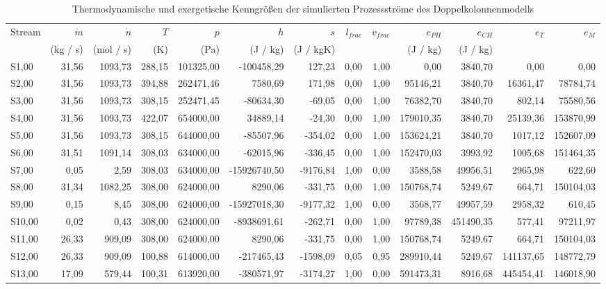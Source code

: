 \begin{longtable}{lrrrrrrrrrrrr}
\caption{Thermodynamische und exergetische Kenngrößen der simulierten Prozessströme des Doppelkolonnenmodells} \\
\hline
Stream & $\dot m$ & $\dot n$ & $T$ & $p$ & $h$ & $s$ & $l_{frac}$ & $v_{frac}$ & $e_{PH}$ & $e_{CH}$ & $e_T$ & $e_M$ \\
 & (kg / s) & (mol / s) & (K) & (Pa) & (J / kg) & (J / kgK) &  &  & (J / kg) & (J / kg) &  &  \\
\hline
S1,00 & 31,56 & 1093,73 & 288,15 & 101325,00 & -100458,29 & 127,23 & 0,00 & 1,00 & 0,00 & 3840,70 & 0,00 & 0,00 \\
S2,00 & 31,56 & 1093,73 & 394,88 & 262471,46 & 7580,69 & 171,98 & 0,00 & 1,00 & 95146,21 & 3840,70 & 16361,47 & 78784,74 \\
S3,00 & 31,56 & 1093,73 & 308,15 & 252471,45 & -80634,30 & -69,05 & 0,00 & 1,00 & 76382,70 & 3840,70 & 802,14 & 75580,56 \\
S4,00 & 31,56 & 1093,73 & 422,07 & 654000,00 & 34889,14 & -24,30 & 0,00 & 1,00 & 179010,35 & 3840,70 & 25139,36 & 153870,99 \\
S5,00 & 31,56 & 1093,73 & 308,15 & 644000,00 & -85507,96 & -354,02 & 0,00 & 1,00 & 153624,21 & 3840,70 & 1017,12 & 152607,09 \\
S6,00 & 31,51 & 1091,14 & 308,03 & 634000,00 & -62015,96 & -336,45 & 0,00 & 1,00 & 152470,03 & 3993,92 & 1005,68 & 151464,35 \\
S7,00 & 0,05 & 2,59 & 308,03 & 634000,00 & -15926740,50 & -9176,84 & 1,00 & 0,00 & 3588,58 & 49956,51 & 2965,98 & 622,60 \\
S8,00 & 31,34 & 1082,25 & 308,00 & 624000,00 & 8290,06 & -331,75 & 0,00 & 1,00 & 150768,74 & 5249,67 & 664,71 & 150104,03 \\
S9,00 & 0,15 & 8,45 & 308,00 & 624000,00 & -15927018,30 & -9177,32 & 1,00 & 0,00 & 3568,77 & 49957,59 & 2958,32 & 610,45 \\
S10,00 & 0,02 & 0,43 & 308,00 & 624000,00 & -8938691,61 & -262,71 & 0,00 & 1,00 & 97789,38 & 451490,35 & 577,41 & 97211,97 \\
S11,00 & 26,33 & 909,09 & 308,00 & 624000,00 & 8290,06 & -331,75 & 0,00 & 1,00 & 150768,74 & 5249,67 & 664,71 & 150104,03 \\
S12,00 & 26,33 & 909,09 & 100,88 & 614000,00 & -217465,43 & -1598,09 & 0,05 & 0,95 & 289910,44 & 5249,67 & 141137,65 & 148772,79 \\
S13,00 & 17,09 & 579,44 & 100,31 & 613920,00 & -380571,97 & -3174,27 & 1,00 & 0,00 & 591473,31 & 8916,68 & 445454,41 & 146018,90 \\

\end{longtable}
